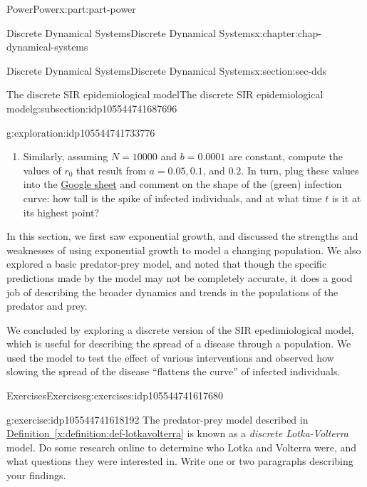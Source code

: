 \documentclass[oneside,10pt,]{book}
\newcommand{\xreffont}{\relax}
\numberwithin{equation}{section}
\begin{document}
\begin{partptx}{Power}{}{Power}{}{}{x:part:part-power}
\begin{chapterptx}{Discrete Dynamical Systems}{}{Discrete Dynamical Systems}{}{}{x:chapter:chap-dynamical-systems}
\begin{sectionptx}{Discrete Dynamical Systems}{}{Discrete Dynamical Systems}{}{}{x:section:sec-dds}
\begin{subsectionptx}{The discrete SIR epidemiological model}{}{The discrete SIR epidemiological model}{}{}{g:subsection:idp105544741687696}
\begin{exploration}{}{g:exploration:idp105544741733776}
\begin{enumerate}
\item{}Similarly, assuming \(N = 10000\) and \(b = 0.0001\) are constant, compute the values of \(r_0\) that result from \(a = 0.05, 0.1\), and \(0.2\). In turn, plug these values into the \href{https://drive.google.com/file/d/1xSJ6KM8x9HVdo9-P4QoUOoSmmfpKmmIQ/view?usp=sharing}{Google sheet}\footnotemark{} and comment on the shape of the (green) infection curve: how tall is the spike of infected individuals, and at what time \(t\) is it at its highest point?%
\end{enumerate}
\end{exploration}%
%
%
%
\end{subsectionptx}
\begin{conclusion}{}%
In this section, we first saw exponential growth, and discussed the strengths and weaknesses of using exponential growth to model a changing population. We also explored a basic predator-prey model, and noted that though the specific predictions made by the model may not be completely accurate, it does a good job of describing the broader dynamics and trends in the populations of the predator and prey.%
\par
We concluded by exploring a discrete version of the SIR epedimiological model, which is useful for describing the spread of a disease through a population. We used the model to test the effect of various interventions and observed how slowing the spread of the disease ``flattens the curve'' of infected individuals.%
\end{conclusion}%
%
%
\typeout{************************************************}
\typeout{************************************************}
%
\begin{exercises-subsection}{Exercises}{}{Exercises}{}{}{g:exercises:idp105544741617680}
\begin{divisionexercise}{1}{}{}{g:exercise:idp105544741618192}%
The predator-prey model described in \hyperref[x:definition:def-lotkavolterra]{Definition~{\xreffont\ref{x:definition:def-lotkavolterra}}} is known as a \emph{discrete Lotka-Volterra} model. Do some research online to determine who Lotka and Volterra were, and what questions they were interested in. Write one or two paragraphs describing your findings.%

\end{divisionexercise}
\end{exercises-subsection}
\end{sectionptx}
\end{chapterptx}
\end{partptx}
\end{document}
